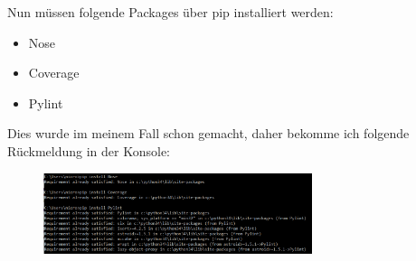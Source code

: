 Nun müssen folgende Packages über pip installiert werden:
\begin{itemize}
	\item Nose
	\item Coverage
	\item Pylint
\end{itemize}

\clearpage

Dies wurde im meinem Fall schon gemacht, daher bekomme ich folgende Rückmeldung in der Konsole:

\begin{figure}[!h]
	\begin{center}
		\includegraphics[width=0.7\textwidth]{images/pip.PNG}
	\end{center}
\end{figure}

